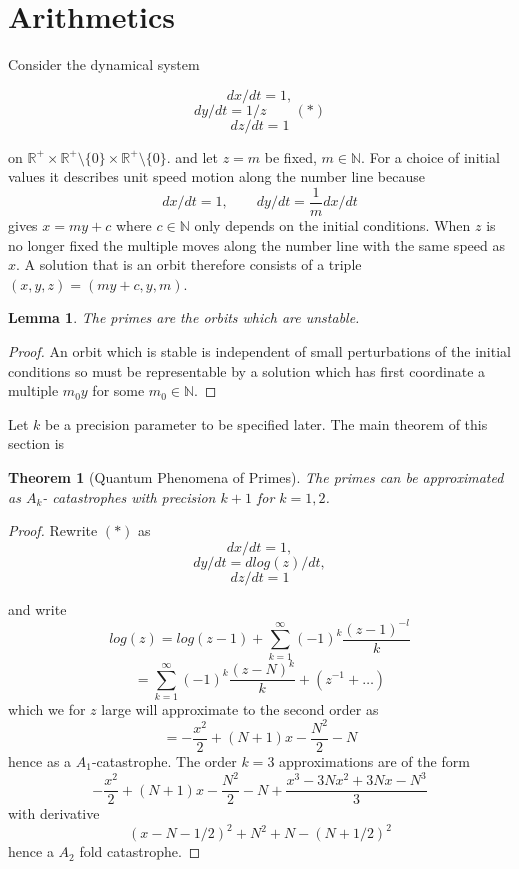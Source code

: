 \documentclass[10pt,a4paper]{amsart}
\newtheorem{theorem}{Theorem}
\newtheorem{lemma}{Lemma}[theorem]
\begin{document}
\section{Arithmetics}

Consider the dynamical system 

$$dx/dt=1,$$
$$dy/dt=1/z\qquad (\ast)$$
$$dz/dt=1$$

on $\mathbb{R}^+\times \mathbb{R}^+\setminus\{0\}\times \mathbb{R}^+\setminus\{0\}.$ and let $z=m$ be fixed, $m\in \mathbb{N}$. 
For a choice of initial values it describes unit speed motion along the number line because 
$$dx/dt=1,\qquad dy/dt=\frac{1}{m} dx/dt$$
gives $x=my+c$ where $c\in\mathbb{N}$ only depends on the initial conditions. When $z$ is no longer fixed the multiple moves along the number line with the same speed as $x$. A solution that is an orbit therefore consists of a triple $(x, y, z)=(my+c, y, m)$.

\begin{lemma}
The primes are the orbits which are unstable. 
\end{lemma}

\begin{proof}
    An orbit which is stable is independent of small perturbations of the initial conditions so must be representable by a solution which has first coordinate a multiple $m_0y$ for some $m_0\in \mathbb{N}$.
\end{proof}

Let $k$ be a precision parameter to be specified later.
The main theorem of this section is

\begin{theorem}[Quantum Phenomena of Primes]
    The primes can be approximated as $A_k$- catastrophes with precision $k+1$ for $k=1, 2$.
\end{theorem}
\begin{proof}
    Rewrite $(\ast)$ as 
    $$dx/dt=1,$$
    $$dy/dt=dlog(z)/dt,$$
    $$dz/dt=1$$

and write
$$log(z)=log(z-1)+\sum_{k=1}^\infty (-1)^k \frac{(z-1)^{-l}}{k}$$
$$=\sum_{k=1}^\infty (-1)^k \frac{(z-N)^k}{k}+(z^{-1}+\dots)$$
which we for $z$ large will approximate to the second order as 
$$=-\frac{x^2}{2}+(N+1)x-\frac{N^2}{2}-N$$
hence as a $A_1$-catastrophe.
The order $k=3$ approximations are of the form 
    $$-\frac{x^2}{2}+(N+1)x-\frac{N^2}{2}-N+\frac{x^3-3Nx^2+3Nx-N^3}{3}$$
    with derivative
    $$(x-N-1/2)^2+N^2+N-(N+1/2)^2$$
    hence a $A_2$ fold catastrophe. 
\end{proof}
\end{document}
